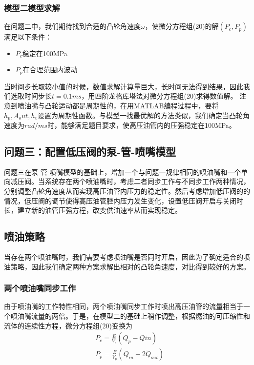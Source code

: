 \documentclass[withoutpreface,bwprint]{cumcmthesis} %
\begin{document}
			\subsubsection{模型二模型求解}
			在问题二中，我们期待找到合适的凸轮角速度$\omega$，使微分方程组(20)的解$(P_c,P_p)$满足以下条件：
			\begin{itemize}
				\item $P_c$稳定在100MPa
				\item $P_p$在合理范围内波动
			\end{itemize}
		
			当时间步长取较小值的时候，数值求解计算量巨大，长时间无法得到结果，因此我们选取时间步长$ t = 0.1ms$，用四阶龙格库塔法对微分方程组(20)求得数值解。
			注意到喷油嘴与凸轮运动都是周期性的，在用MATLAB编程过程中，要将$h_p,A_out,h_v$设置为周期性函数。与模型一找最优解的方法类似，我们确定当凸轮角速度为$rad/ms$时，能够满足题目要求，使高压油管内的压强稳定在100MPa。
						
			\subsection{问题三：配置低压阀的泵­-管-­喷嘴模型}
			问题三在泵-管-喷嘴模型的基础上，增加一个与问题一规律相同的喷油嘴和一个单向减压阀。当系统存在两个喷油嘴时，考虑二者同步工作与不同步工作两种情况，分别调整凸轮角速度从而实现高压油管内压力的稳定性。然后考虑增加低压阀的的情况，低压阀的调节使得高压油管腔内压力发生变化，设置低压阀开启与关闭时长，建立新的油管压强方程，改变供油速率从而实现稳定。
			
			\subsection{喷油策略}
			当存在两个喷油嘴时，我们需要考虑喷油嘴是否同时开启，因此为了确定适合的喷油策略，因此我们确定两种方案求解出相对的凸轮角速度，对比得到较好的方案。
			
			\subsubsection{两个喷油嘴同步工作}
			由于喷油嘴的工作特性相同，两个喷油嘴同步工作时喷出高压油管的流量相当于一个喷油嘴流量的两倍。于是，在模型二的基础上稍作调整，根据燃油的可压缩性和流体的连续性方程，微分方程组(20)变换为
			\begin{equation}
			\begin{aligned}
			&P_c=\frac{E}{V_c}(Q_p-Q{in}) \\
			&P_p=\frac{E}{V_p}(Q_{in}-2\dot Q_{out})
			\end{aligned}
			\end{equation}
			
\end{document}
